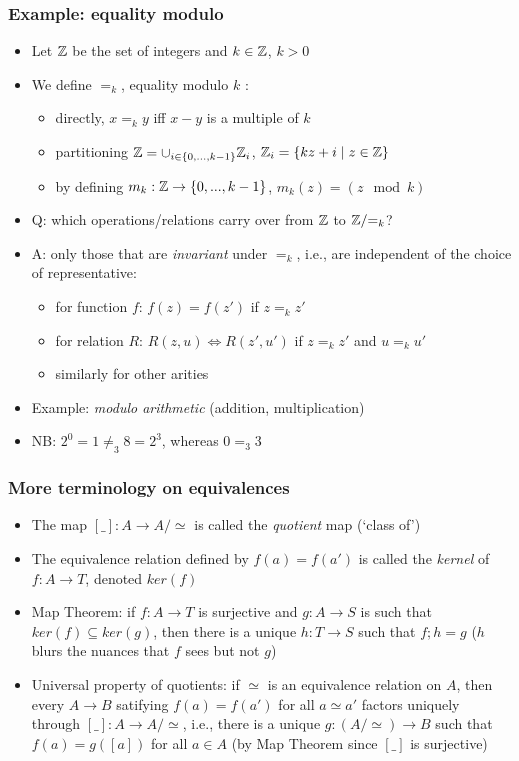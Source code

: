 \documentclass[handout]{beamer}
\begin{document}
\frame
  {   
    \frametitle{Example: equality modulo}\label{Ch4:EqExa}

 \begin{itemize}[<+->]
\item Let $\mathbb{Z}$ be the set of integers and $k\in\mathbb{Z}$, $k>0$
\item We define $=_k$, equality modulo $k$ :
   \begin{itemize}[<+->]
\item directly, $x =_k y$ iff $x-y$ is a multiple of $k$
\item partitioning $\mathbb{Z} = \cup_{i\in \{0,...,k-1\}} \mathbb{Z}_i $, $\mathbb{Z}_i = \{kz+i \mid z\in\mathbb{Z}\}$
\item by defining  $m_k: \mathbb{Z}\to \{0,...,k-1\}$, $m_k(z) = (z \mod k)$ 
   \end{itemize}
\item Q: which operations/relations carry over from $\mathbb{Z}$ to $\mathbb{Z}/{=_k}$?
\item A: only those that are \emph{invariant} under ${=_k}$, i.e., are
independent of the choice of representative:
   \begin{itemize}[<+->]
\item for function $f$:  $f(z) = f(z')$ if $z =_k z'$ 
\item for relation $R$:  $R(z,u) \iff R(z',u')$    if $z =_k z'$ and $u =_k u'$
\item similarly for other arities
   \end{itemize}
\item Example: \emph{modulo arithmetic} (addition, multiplication)
\item {\color{red}NB}: $2^0 = 1 \neq_3 8 = 2^3$, whereas $0 =_3 3$
 \end{itemize}

 }

\frame
  {   
    \frametitle{More terminology on equivalences}\label{Ch4:Eqvs}

 \begin{itemize}[<+->]
\item The map $[\_] : A\to A/{\simeq}$ is called the \emph{quotient} map (`class of')
\item The equivalence relation defined by $f(a)=f(a')$  is called the \emph{kernel} of $f:A\to T$,
 denoted $ker(f)$
\item Map Theorem: if $f:A\to T$ is surjective and $g:A\to S$ is such that $ker(f)\subseteq ker(g)$,
then there is a unique $h: T\to S$ such that $f;h=g$ ($h$ blurs the  nuances 
that $f$ sees but not $g$)
\item Universal property of quotients: if $\simeq$ is an equivalence relation on $A$,
then every $A\to B$  satifying $f(a)=f(a')$ for all $a\simeq a'$ factors uniquely
through $[\_]:  A\to A/{\simeq}$, i.e., there is a unique $g: (A/{\simeq})\to B$ such
that $f(a) = g([a])$ for all $a\in A$ (by Map Theorem since $[\_]$ is surjective)
 \end{itemize}

 }
\end{document}
